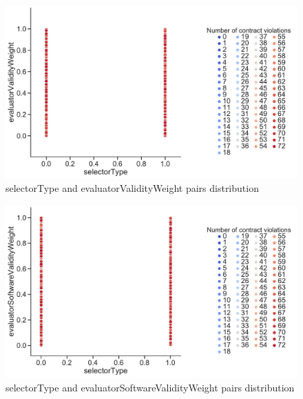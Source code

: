 \begin{figure}
	\centering
	\includegraphics[width=\textwidth]{images/PairsDistr/selectorType_evaluatorValidityWeight.pdf}
	\caption[selectorType and evaluatorValidityWeight pairs distribution]{selectorType and evaluatorValidityWeight pairs distribution}
	\label{fig:selectorType_evaluatorValidityWeight_pair}
\end{figure}
\begin{figure}
	\centering
	\includegraphics[width=\textwidth]{images/PairsDistr/selectorType_evaluatorSoftwareValidityWeight.pdf}
	\caption[selectorType and evaluatorSoftwareValidityWeight pairs distribution]{selectorType and evaluatorSoftwareValidityWeight pairs distribution}
	\label{fig:selectorType_evaluatorSoftwareValidityWeight_pair}
\end{figure}
